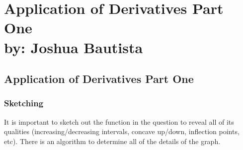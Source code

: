 \documentclass[12pt,fleqn]{book} %
\begin{document}
\part{Application of Derivatives Part One\\ by: Joshua Bautista}


\chapter{Application of Derivatives Part One}

\vspace*{-20mm}

\section{Sketching}

It is important to sketch out the function in the question to reveal all of its qualities (increasing/decreasing intervals, concave up/down, inflection points, etc).
There is an algorithm to determine all of the details of the graph.

\vspace*{3mm}
\end{document}

